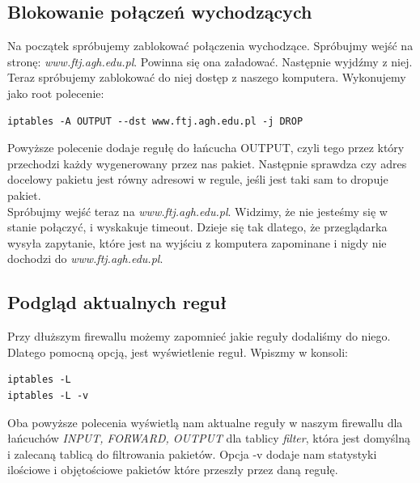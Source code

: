 \documentclass[a4paper,11pt]{article}
\begin{document}
\subsection{Blokowanie połączeń wychodzących}
Na początek spróbujemy zablokować połączenia wychodzące. Spróbujmy wejść na stronę: \textit{www.ftj.agh.edu.pl}. Powinna się ona załadować. Następnie wyjdźmy z niej.\\
Teraz spróbujemy zablokować do niej dostęp z naszego komputera. Wykonujemy jako root polecenie:
\begin{verbatim}
iptables -A OUTPUT --dst www.ftj.agh.edu.pl -j DROP
\end{verbatim}
Powyższe polecenie dodaje regułę do łańcucha OUTPUT, czyli tego przez który przechodzi każdy wygenerowany przez nas pakiet. Następnie sprawdza czy adres docelowy pakietu jest równy adresowi w regule, jeśli jest taki sam to dropuje pakiet.\\
Spróbujmy wejść teraz na \textit{www.ftj.agh.edu.pl}. Widzimy, że nie jesteśmy się w stanie połączyć, i wyskakuje timeout. Dzieje się tak dlatego, że przeglądarka wysyła zapytanie, które jest na wyjściu z komputera zapominane i nigdy nie dochodzi do \textit{www.ftj.agh.edu.pl}.\\
\subsection{Podgląd aktualnych reguł}
Przy dłuższym firewallu możemy zapomnieć jakie reguły dodaliśmy do niego. Dlatego pomocną opcją, jest wyświetlenie reguł. Wpiszmy w konsoli:
\begin{verbatim}
iptables -L
iptables -L -v
\end{verbatim}
Oba powyższe polecenia wyświetlą nam aktualne reguły w naszym firewallu dla łańcuchów \textit{INPUT, FORWARD, OUTPUT} dla tablicy \textit{filter}, która jest domyślną i zalecaną tablicą do filtrowania pakietów. Opcja -v dodaje nam statystyki ilościowe i objętościowe pakietów które przeszły przez daną regułę. 
\end{document}
